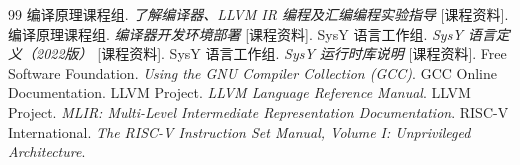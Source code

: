 \begin{thebibliography}{99}
 编译原理课程组. \emph{了解编译器、LLVM IR 编程及汇编编程实验指导} [课程资料].
 编译原理课程组. \emph{编译器开发环境部署} [课程资料].
 SysY 语言工作组. \emph{SysY 语言定义（2022版）} [课程资料].
 SysY 语言工作组. \emph{SysY 运行时库说明} [课程资料].
 Free Software Foundation. \emph{Using the GNU Compiler Collection (GCC)}. GCC Online Documentation.
 LLVM Project. \emph{LLVM Language Reference Manual}.
 LLVM Project. \emph{MLIR: Multi-Level Intermediate Representation Documentation}.
 RISC-V International. \emph{The RISC-V Instruction Set Manual, Volume I: Unprivileged Architecture}.
\end{thebibliography}
